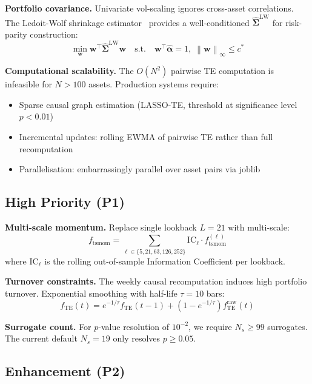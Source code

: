 \documentclass[12pt,a4paper]{article}
\newcommand{\norm}[1]{\left\lVert#1\right\rVert}
\newcommand{\bm}[1]{\boldsymbol{#1}}
\begin{document}
\textbf{Portfolio covariance.} Univariate vol-scaling ignores cross-asset correlations.
The Ledoit-Wolf shrinkage estimator~\citep{ledoit2004} provides a well-conditioned
$\hat{\bm{\Sigma}}^{\text{LW}}$ for risk-parity construction:
\begin{equation}
    \min_{\bm{w}} \bm{w}^\top \hat{\bm{\Sigma}}^{\text{LW}} \bm{w} \quad
    \text{s.t.}\quad \bm{w}^\top \hat{\bm{\alpha}} = 1,\; \norm{\bm{w}}_\infty \leq c^*
\end{equation}

\textbf{Computational scalability.} The $O(N^2)$ pairwise TE computation is
infeasible for $N > 100$ assets. Production systems require:
\begin{itemize}
    \item Sparse causal graph estimation (LASSO-TE, threshold at significance level $p < 0.01$)
    \item Incremental updates: rolling EWMA of pairwise TE rather than full recomputation
    \item Parallelisation: embarrassingly parallel over asset pairs via joblib
\end{itemize}

\subsection{High Priority (P1)}

\textbf{Multi-scale momentum.} Replace single lookback $L=21$ with multi-scale:
\begin{equation}
    f_{\text{tsmom}} = \sum_{\ell \in \{5,21,63,126,252\}} \text{IC}_\ell \cdot f_{\text{tsmom}}^{(\ell)}
\end{equation}
where $\text{IC}_\ell$ is the rolling out-of-sample Information Coefficient per
lookback.

\textbf{Turnover constraints.} The weekly causal recomputation induces high
portfolio turnover. Exponential smoothing with half-life $\tau = 10$ bars:
\begin{equation}
    f_{\text{TE}}(t) = e^{-1/\tau} f_{\text{TE}}(t-1) + (1-e^{-1/\tau}) f_{\text{TE}}^{\text{raw}}(t)
\end{equation}

\textbf{Surrogate count.} For $p$-value resolution of $10^{-2}$, we require
$N_s \geq 99$ surrogates. The current default $N_s = 19$ only resolves
$p \geq 0.05$.

\subsection{Enhancement (P2)}
\end{document}
